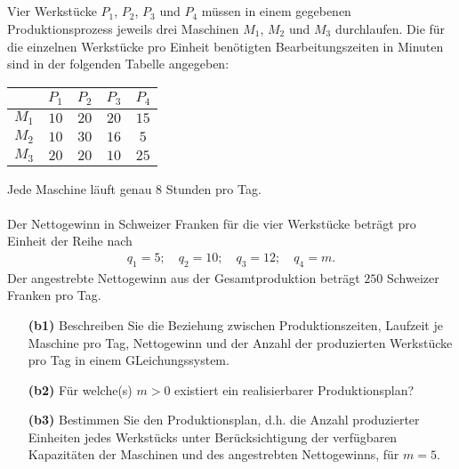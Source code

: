 \subsection*{}
Vier Werkstücke $P_1$, $P_2$, $P_3$ und $P_4$ müssen in einem gegebenen Produktionsprozess jeweils drei Maschinen $M_1$, $M_2$ und $M_3$ durchlaufen.
Die für die einzelnen Werkstücke pro Einheit benötigten Bearbeitungszeiten in Minuten sind in der folgenden Tabelle angegeben: 
\begin{table}[H]
	\centering
	\begin{tabular}{c | c c c c}
		$ $  & $P_1$  &  $P_2$ &  $P_3$ & $P_4$ \\ 
		\hline
		$ M_1 $ & $ 10 $ & $ 20 $ & $ 20 $ & $15$  \\ 
		$ M_2 $ & $ 10 $ & $ 30 $ & $ 16 $ & $5$ \\
		$ M_3 $ & $ 20 $ & $ 20 $ & $ 10 $ & $25$
	\end{tabular}%
\end{table}
Jede Maschine läuft genau $8$ Stunden pro Tag.\\
\\
Der Nettogewinn in Schweizer Franken für die vier Werkstücke beträgt pro Einheit der Reihe nach
\begin{align*}
	q_1 = 5; \quad
	q_2=  10; \quad
	q_3=12; \quad 
	q_4=m.
\end{align*}
Der angestrebte Nettogewinn aus der Gesamtproduktion beträgt $250$ Schweizer Franken pro Tag.
\begin{enumerate}
	\item[\textbf{(b1)}]
	Beschreiben Sie die Beziehung zwischen Produktionszeiten, Laufzeit je Maschine pro Tag, Nettogewinn und der Anzahl der produzierten Werkstücke pro Tag in einem GLeichungssystem.

	\item[\textbf{(b2)}] 
	Für welche(s) $m > 0$ existiert ein realisierbarer Produktionsplan?
	\item[\textbf{(b3)}]
	Bestimmen Sie den Produktionsplan, d.h. die Anzahl produzierter Einheiten jedes Werkstücks unter Berücksichtigung der verfügbaren Kapazitäten der Maschinen und des angestrebten Nettogewinns, für $m = 5$.
\end{enumerate}

\ \\
